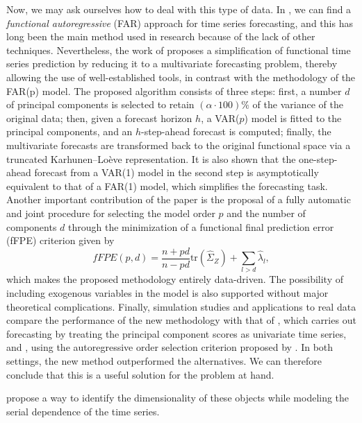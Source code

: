 \documentclass[article]{abntex2}
\begin{document}
Now, we may ask ourselves how to deal with this type of data. In , we can find a \textit{functional autoregressive} (FAR) approach for time series forecasting, and this has long been the main method used in research because of the lack of other techniques. Nevertheless, the work of  proposes a simplification of functional time series prediction by reducing it to a multivariate forecasting problem, thereby allowing the use of well-established tools, in contrast with the methodology of the FAR(p) model. The proposed algorithm consists of three steps: first, a number $d$ of principal components is selected to retain $(\alpha \cdot 100)\%$ of the variance of the original data; then, given a forecast horizon $h$, a VAR($p$) model is fitted to the principal components, and an $h$-step-ahead forecast is computed; finally, the multivariate forecasts are transformed back to the original functional space via a truncated Karhunen--Lo\`eve representation. It is also shown that the one-step-ahead forecast from a VAR(1) model in the second step is asymptotically equivalent to that of a FAR(1) model, which simplifies the forecasting task. Another important contribution of the paper is the proposal of a fully automatic and joint procedure for selecting the model order $p$ and the number of components $d$ through the minimization of a functional final prediction error (fFPE) criterion given by
\begin{equation}
 \textit{fFPE}(p,d)=\frac{n+pd}{n-pd}\mathrm{tr}(\hat{\Sigma}_{Z})+\sum_{l>d}\hat{\lambda}_{l},
\end{equation}
which makes the proposed methodology entirely data-driven. The possibility of including exogenous variables in the model is also supported without major theoretical complications. Finally, simulation studies and applications to real data compare the performance of the new methodology with that of , which carries out forecasting by treating the principal component scores as univariate time series, and , using the autoregressive order selection criterion proposed by . In both settings, the new method outperformed the alternatives. We can therefore conclude that this is a useful solution for the problem at hand.

 propose a way to identify the dimensionality of these objects while modeling the serial dependence of the time series.
\end{document}
